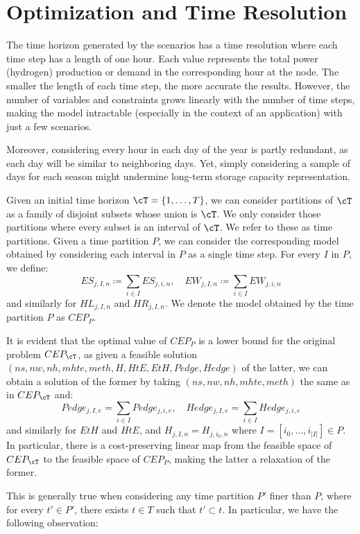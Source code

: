 \section{Optimization and Time Resolution}\label{section:time-resolution}
{
\color{gray}
The time horizon generated by the scenarios has a time resolution where each time step has a length of one hour. Each value represents the total power (hydrogen) production or demand in the corresponding hour at the node. The smaller the length of each time step, the more accurate the results. However, the number of variables and constraints grows linearly with the number of time steps, making the model intractable (especially in the context of an application) with just a few scenarios.

Moreover, considering every hour in each day of the year is partly redundant, as each day will be similar to neighboring days. Yet, simply considering a sample of days for each season might undermine long-term storage capacity representation. 

Given an initial time horizon \(\cT = \{1, \ldots, T\}\), we can consider partitions of \(\cT\) as a family of disjoint subsets whose union is \(\cT\). We only consider those partitions where every subset is an interval of \(\cT\). We refer to these as time partitions. Given a time partition \(P\), we can consider the corresponding model obtained by considering each interval in \(P\) as a single time step. For every \(I\) in \(P\), we define:
\[
ES_{j,I,n} \coloneqq \sum_{i \in I} ES_{j,i,n}, \quad EW_{j,I,n} \coloneqq \sum_{i \in I} EW_{j,i,n}
\]
and similarly for \(HL_{j,I,n}\) and \(HR_{j,I,n}\). We denote the model obtained by the time partition \(P\) as \(CEP_P\).

It is evident that the optimal value of \(CEP_P\) is a lower bound for the original problem \(CEP_{\cT}\), as given a feasible solution \((ns, nw, nh, mhte, meth, H, HtE, EtH, Pedge, Hedge)\) of the latter, we can obtain a solution of the former by taking \((ns, nw, nh, mhte, meth)\) the same as in \(CEP_{\cT}\) and:
\[
Pedge_{j,I,e} = \sum_{i \in I} Pedge_{j,i,e}, \quad Hedge_{j,I,e} = \sum_{i \in I} Hedge_{j,i,e}
\]
and similarly for \(EtH\) and \(HtE\), and \(H_{j,I,n} = H_{j,i_0,n}\) where \(I = [i_0,\ldots,i_{|I|}] \in P\). In particular, there is a cost-preserving linear map from the feasible space of \(CEP_{\cT}\) to the feasible space of \(CEP_P\), making the latter a relaxation of the former.

This is generally true when considering any time partition \(P'\) finer than \(P\), where for every \(t' \in P'\), there exists \(t \in T\) such that \(t' \subset t\). In particular, we have the following observation:

}
